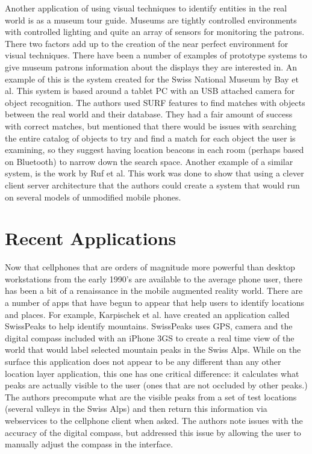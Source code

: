 \documentclass{acm_proc_article-sp}
\begin{document}
Another application of using visual techniques to identify entities in the real world is as a museum tour guide.  Museums are tightly controlled environments with controlled lighting and quite an array of sensors for monitoring the patrons. There two factors add up to the creation of the near perfect environment for visual techniques.   There have been a number of examples of prototype systems to give museum patrons information about the displays they are interested in.  An example of this is the system created for the Swiss National Museum by Bay et al.  This system is based around a tablet PC with an USB attached camera for object recognition.  The authors used SURF features to find matches with objects between the real world and their database.  They had a fair amount of success with correct matches, but mentioned that there would be issues with searching the entire catalog of objects to try and find a match for each object the user is examining, so they suggest having location beacons in each room (perhaps based on Bluetooth) to narrow down the search space. \cite{bay2006interactive}  Another example of a similar system, is the work by Ruf et al. \cite{ruf2010mobile}  This work was done to show that using a clever client server architecture that the authors could create a system that would run on several models of unmodified mobile phones.

\section{Recent Applications}
Now that cellphones that are orders of magnitude more powerful than desktop workstations from the early 1990's are available to the average phone user, there has been a bit of a renaissance in the mobile augmented reality world.  
There are a number of apps that have begun to appear that help users to identify locations and places.  For example, Karpischek et al. have created an application called SwissPeaks to help identify mountains.  SwissPeaks uses GPS, camera and the digital compass included with an iPhone 3GS to create a real time view of the world that would label selected mountain peaks in the Swiss Alps.  While on the surface this application does not appear to be any different than any other location layer application, this one has one critical difference: it calculates what peaks are actually visible to the user (ones that are not occluded by other peaks.)  The authors precompute what are the visible peaks from a set of test locations (several valleys in the Swiss Alps) and then return this information via webservices to the cellphone client when asked.  The authors note issues with the accuracy of the digital compass, but addressed this issue by allowing the user to manually adjust the compass in the interface.  \cite{karpischek2009swisspeaks}
\end{document}
